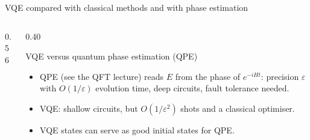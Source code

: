 \documentclass[aspectratio=169,11pt]{beamer}
\begin{document}
\begin{frame}{VQE compared with classical methods and with phase estimation}
  \footnotesize
  \begin{columns}[T]
    \begin{column}{0.56\textwidth}
    \end{column}
    \begin{column}{0.40\textwidth}
      \begin{block}{VQE versus quantum phase estimation (QPE)}
        \begin{itemize}
          \item QPE (see the QFT lecture) reads $E$ from the phase of $e^{-iHt}$: precision $\varepsilon$ with $O(1/\varepsilon)$ evolution time,
            deep circuits, fault tolerance needed.
          \item VQE: shallow circuits, but $O(1/\varepsilon^2)$ shots and a classical optimiser.
          \item VQE states can serve as good initial states for QPE.
        \end{itemize}
      \end{block}
    \end{column}
  \end{columns}
\end{frame}
\end{document}

